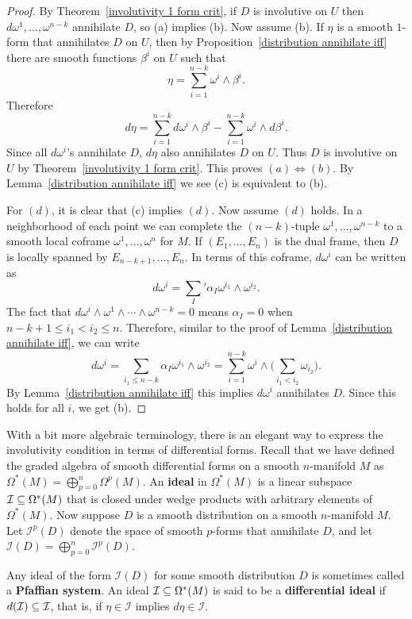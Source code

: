 \begin{proof}
By Theorem~\ref{involutivity 1 form crit}, if $D$ is involutive on $U$ then $d\omega^1,\dots,\omega^{n-k}$ annihilate $D$, so (a) implies (b). Now assume (b). If $\eta$ is a smooth $1$-form that annihilates $D$ on $U$, then by Proposition~\ref{distribution annihilate iff} there are smooth functions $\beta^i$ on $U$ such that
\[\eta=\sum_{i=1}^{n-k}\omega^i\wedge\beta^i.\]
Therefore
\[d\eta=\sum_{i=1}^{n-k}d\omega^i\wedge\beta^i-\sum_{i=1}^{n-k}\omega^i\wedge d\beta^i.\]
Since all $d\omega^i$'s annihilate $D$, $d\eta$ also annihilates $D$ on $U$. Thus $D$ is involutive on $U$ by Theorem~\ref{involutivity 1 form crit}. This proves $(a)\Leftrightarrow(b)$. By Lemma~\ref{distribution annihilate iff} we see (c) is equivalent to (b).\par
For $(d)$, it is clear that (c) implies $(d)$. Now assume $(d)$ holds. In a neighborhood of each point we can complete the $(n-k)$-tuple $\omega^1,\dots,\omega^{n-k}$ to a smooth local coframe $\omega^1,\dots,\omega^n$ for $M$. If $(E_1,\dots,E_n)$ is the dual frame, then $D$ is locally spanned by $E_{n-k+1},\dots,E_n$. In terms of this coframe, $d\omega^i$ can be written as
\[d\omega^i=\sum_{I}'\alpha_{I}\omega^{i_1}\wedge\omega^{i_2}.\]
The fact that $d\omega^i\wedge\omega^1\wedge\cdots\wedge\omega^{n-k}=0$ means $\alpha_{I}=0$ when $n-k+1\leq i_1<i_2\leq n$. Therefore, similar to the proof of Lemma~\ref{distribution annihilate iff}, we can write
\[d\omega^i=\sum_{i_1\leq n-k}\alpha_I\omega^{i_1}\wedge\omega^{i_2}=\sum_{i=1}^{n-k}\omega^i\wedge\Big(\sum_{i_1<i_2}\omega_{i_2}\Big).\]
By Lemma~\ref{distribution annihilate iff} this implies $d\omega^i$ annihilates $D$. Since this holds for all $i$, we get (b).
\end{proof}
With a bit more algebraic terminology, there is an elegant way to express the involutivity condition in terms of differential forms. Recall that we have defined
the graded algebra of smooth differential forms on a smooth $n$-manifold $M$ as $\Omega^*(M)=\bigoplus_{p=0}^{n}\Omega^p(M)$. An \textbf{ideal} in $\Omega^*(M)$ is a linear
subspace $\mathcal{I}\subseteq\Omega^*(M)$ that is closed under wedge products with arbitrary elements of $\Omega^*(M)$. Now suppose $D$ is a smooth distribution on a 
smooth $n$-manifold $M$. Let $\mathcal{I}^p(D)$ denote the space of smooth $p$-forms that annihilate $D$, and let $\mathcal{I}(D)=\bigoplus_{p=0}^{n}\mathcal{I}^p(D)$.\par
Any ideal of the form $\mathcal{I}(D)$ for some smooth distribution $D$ is sometimes called a \textbf{Pfaffian system}. An ideal $\mathcal{I}\subseteq\Omega^*(M)$ is said to be a \textbf{differential ideal} if $d(\mathcal{I})\subseteq\mathcal{I}$, that is, if $\eta\in\mathcal{I}$ implies $d\eta\in\mathcal{I}$.
